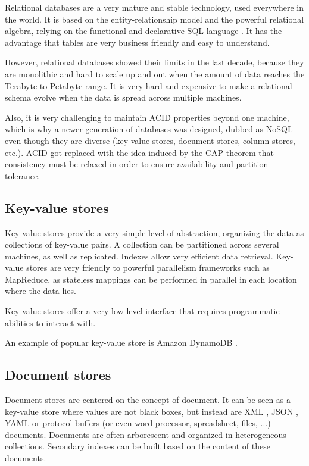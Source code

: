 \documentclass{acm_proc_article-sp}
\begin{document}
Relational databases are a very mature and stable technology, used everywhere in the world. It is based on the entity-relationship model and the powerful relational algebra, relying on the functional and declarative SQL language \cite{Chamberlin1974}. It has the advantage that tables are very business friendly and easy to understand.

However, relational databases showed their limits in the last decade, because they are monolithic and hard to scale up and out when the amount of data reaches the Terabyte to Petabyte range. It is very hard and expensive to make a relational schema evolve when the data is spread across multiple machines.

Also, it is very challenging to maintain ACID properties \cite{Haerder1983} beyond one machine, which is why a newer generation of databases was designed, dubbed as NoSQL even though they are diverse (key-value stores, document stores, column stores, etc.). ACID got replaced with the idea induced by the CAP theorem \cite{Gilbert2002} that consistency must be relaxed in order to ensure availability and partition tolerance.

\subsection{Key-value stores}

Key-value stores provide a very simple level of abstraction, organizing the data as collections of key-value pairs. A collection can be partitioned across several machines, as well as replicated. Indexes allow very efficient data retrieval. Key-value stores are very friendly to powerful parallelism frameworks such as MapReduce, as stateless mappings can be performed in parallel in each location where the data lies.

Key-value stores offer a very low-level interface that requires programmatic abilities to interact with.

An example of popular key-value store is Amazon DynamoDB \cite{DeCandia2007}.

\subsection{Document stores}

Document stores are centered on the concept of document. It can be seen as a key-value store where values are not black boxes, but instead are XML \cite{XML}, JSON \cite{JSON}, YAML \cite{YAML} or protocol buffers \cite{ProtocolBuffers} (or even word processor, spreadsheet, files, ...) documents. Documents are often arborescent and organized in heterogeneous collections. Secondary indexes can be built based on the content of these documents.
\end{document}
